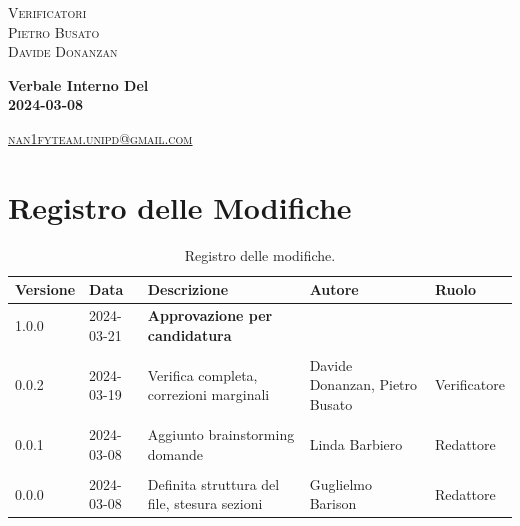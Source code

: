 \documentclass[8pt]{article}
\begin{document}
\begin{titlepage}
\begin{minipage}[t]{0.47\textwidth}
		{\large{\textsc{Verificatori}}
			\vspace{3mm}
			{\\\large{\textsc{Pietro Busato}\\}} %
			{\large{\textsc{Davide Donanzan}}}
			
		}
		\vspace{4mm}\vspace{4mm}
	\end{minipage}
	\vspace{4cm}
	\begin{center}
		\begin{flushright}
			{\fontsize{30pt}{52pt}\selectfont \textbf{Verbale Interno Del\\2024-03-08\\}} %
		\end{flushright}
		\vspace{3cm}
	\end{center}
	\vspace{8.5 cm}
	{\small \textsc{\href{mailto: nan1fyteam.unipd@gmail.com}{nan1fyteam.unipd@gmail.com}}}
\end{titlepage}
\pagestyle{mystyle}
\section*{Registro delle Modifiche}
\begin{table}[ht!]	
	\centering
	\begin{tabular}{ p{1.2cm} p{2cm} p{6cm} p{3cm} p{2cm}}
		\toprule
		\textbf{Versione}& \textbf{Data} & \textbf{Descrizione} & \textbf{Autore} & \textbf{Ruolo} \\
		\midrule
		1.0.0 & 2024-03-21 &\textbf{Approvazione per candidatura} & & \\\\
		0.0.2 & 2024-03-19 & Verifica completa, correzioni marginali & Davide Donanzan, Pietro Busato & Verificatore \\\\
		0.0.1 & 2024-03-08 & Aggiunto brainstorming domande & Linda Barbiero &
		Redattore \\\\ %
		0.0.0 & 2024-03-08 & Definita struttura del file, stesura sezioni & Guglielmo Barison & Redattore \\
		\bottomrule
	\end{tabular}
	\caption{Registro delle modifiche.}
	\label{table:Registro delle modifiche}
\end{table}
\newpage
\tableofcontents
\clearpage
\newpage
\justifying
\end{document}
